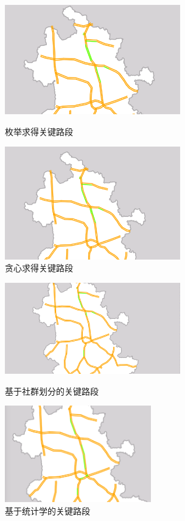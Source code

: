 				\begin{figure}
				\begin{minipage}{0.5\linewidth}
					\centering
					\includegraphics[width=3in]{picture/meiju}
					\caption{枚举求得关键路段}
					\label{jihe1}
				\end{minipage}%
				\begin{minipage}{0.5\linewidth}
					\centering
					\includegraphics[width=3in]{picture/tanxin}
					\caption{贪心求得关键路段}
					\label{jihe2}
				\end{minipage}
				\end{figure}

				\begin{figure}
				\begin{minipage}{0.5\linewidth}
					\centering
					\includegraphics[width=3in]{picture/fenqun}
					\caption{基于社群划分的关键路段}
					\label{jihe3}
				\end{minipage}%
				\begin{minipage}{0.5\linewidth}
					\centering
					\includegraphics[width=2.5in]{picture/hotsection}
					\caption{基于统计学的关键路段}
					\label{jihe4}
				\end{minipage}
				\end{figure}

